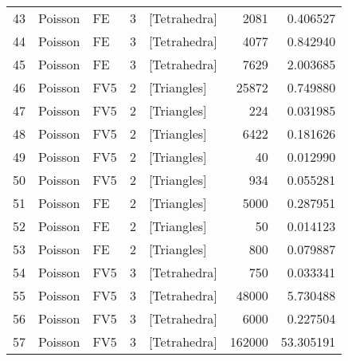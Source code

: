 \begin{tabular}{lllrlrr}
43 &   Poisson &                    FE &               3 &   [Tetrahedra] &                     2081 &                         0.406527 \\
44 &   Poisson &                    FE &               3 &   [Tetrahedra] &                     4077 &                         0.842940 \\
45 &   Poisson &                    FE &               3 &   [Tetrahedra] &                     7629 &                         2.003685 \\
46 &   Poisson &                   FV5 &               2 &    [Triangles] &                    25872 &                         0.749880 \\
47 &   Poisson &                   FV5 &               2 &    [Triangles] &                      224 &                         0.031985 \\
48 &   Poisson &                   FV5 &               2 &    [Triangles] &                     6422 &                         0.181626 \\
49 &   Poisson &                   FV5 &               2 &    [Triangles] &                       40 &                         0.012990 \\
50 &   Poisson &                   FV5 &               2 &    [Triangles] &                      934 &                         0.055281 \\
51 &   Poisson &                    FE &               2 &    [Triangles] &                     5000 &                         0.287951 \\
52 &   Poisson &                    FE &               2 &    [Triangles] &                       50 &                         0.014123 \\
53 &   Poisson &                    FE &               2 &    [Triangles] &                      800 &                         0.079887 \\
54 &   Poisson &                   FV5 &               3 &   [Tetrahedra] &                      750 &                         0.033341 \\
55 &   Poisson &                   FV5 &               3 &   [Tetrahedra] &                    48000 &                         5.730488 \\
56 &   Poisson &                   FV5 &               3 &   [Tetrahedra] &                     6000 &                         0.227504 \\
57 &   Poisson &                   FV5 &               3 &   [Tetrahedra] &                   162000 &                        53.305191 \\

\end{tabular}
